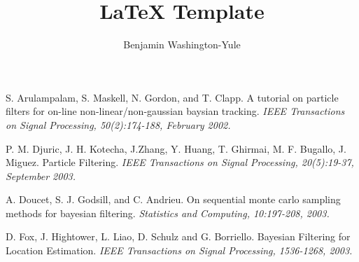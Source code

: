 \documentclass[a4paper, 12pt]{article}
\begin{document}
\title{LaTeX Template}
\author{Benjamin Washington-Yule}



\vspace*{\fill}

\vspace*{\fill}
\pagebreak






\begin{thebibliography}{99}
 S. Arulampalam, S. Maskell, N. Gordon, and T. Clapp. A tutorial
on particle filters for on-line non-linear/non-gaussian baysian tracking.
\emph{IEEE Transactions on Signal Processing, 50(2):174-188, February 2002.}

 P. M. Djuric, J. H. Kotecha, J.Zhang, Y. Huang, T. Ghirmai, M.
F. Bugallo, J. Miguez. Particle Filtering. \emph{IEEE Transactions on Signal
Processing, 20(5):19-37, September 2003.}

 A. Doucet, S. J. Godsill, and C. Andrieu. 
On sequential monte carlo sampling methods for bayesian filtering.
\emph{Statistics and Computing, 10:197-208, 2003.}

 D. Fox, J. Hightower, L. Liao, D. Schulz and G. Borriello.
Bayesian Filtering for Location Estimation.
\emph{IEEE Transactions on Signal
Processing, 1536-1268, 2003.}


\end{thebibliography}
\end{document}
